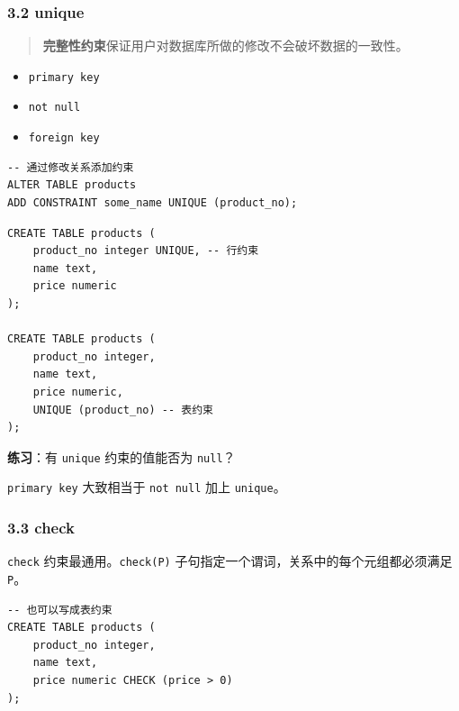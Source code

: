\documentclass[aspectratio=169, 14pt]{beamer}
\begin{document}
\begin{frame}[fragile]
    \frametitle{3.2 unique}

\begin{quote}
    \textbf{完整性约束}保证用户对数据库所做的修改不会破坏数据的一致性。
\end{quote}

\begin{itemize}
    \item \texttt{primary key}
    \item \texttt{not null}
    \item \texttt{foreign key}
\end{itemize}
\pause

\begin{verbatim}
-- 通过修改关系添加约束
ALTER TABLE products 
ADD CONSTRAINT some_name UNIQUE (product_no);
\end{verbatim}

\end{frame}

\begin{frame}[fragile]

    \begin{verbatim}
CREATE TABLE products (
    product_no integer UNIQUE, -- 行约束
    name text,
    price numeric
);

CREATE TABLE products (
    product_no integer,
    name text,
    price numeric,
    UNIQUE (product_no) -- 表约束
);
    \end{verbatim} 

    {\large {}}  \textbf{练习}：有 \texttt{unique} 约束的值能否为 \texttt{null}？

\end{frame}

{
\begin{frame}[standout]
  \texttt{primary key} 大致相当于 \texttt{not null} 加上 \texttt{unique}。
\end{frame}
}

\begin{frame}[fragile]
    \frametitle{3.3 check}
\texttt{check} 约束最通用。\texttt{check(P)} 子句指定一个谓词，关系中的每个元组都必须满足 \texttt{P}。

\begin{verbatim}
-- 也可以写成表约束
CREATE TABLE products (
    product_no integer,
    name text,
    price numeric CHECK (price > 0)
);
\end{verbatim}

\end{frame}
\end{document}
